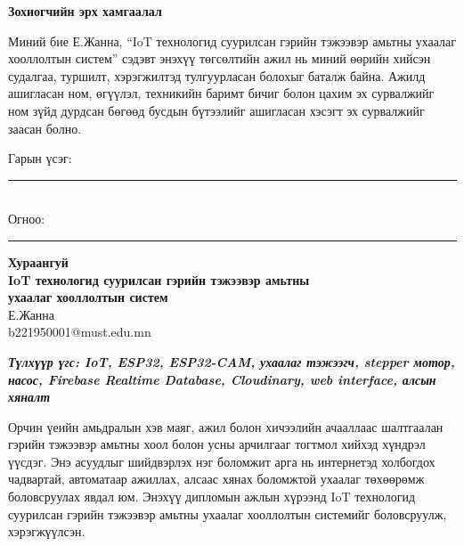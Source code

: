 \documentclass[12pt,a4paper]{report}
\begin{document}
\begin{center}
  \vspace*{2cm}
  {\huge\textbf{Зохиогчийн эрх хамгаалал}}
\end{center}
\vspace{1.2cm}

\noindent Миний бие Е.Жанна, ``IoT технологид суурилсан гэрийн тэжээвэр амьтны ухаалаг хооллолтын систем'' сэдэвт энэхүү төгсөлтийн ажил нь миний өөрийн хийсэн судалгаа, туршилт, хэрэгжилтэд тулгуурласан болохыг баталж байна. Ажилд ашигласан ном, өгүүлэл, техникийн баримт бичиг болон цахим эх сурвалжийг ном зүйд дурдсан бөгөөд бусдын бүтээлийг ашигласан хэсэгт эх сурвалжийг заасан болно.

\vspace{2cm}
\noindent Гарын үсэг: \rule{5cm}{0.4pt}\\[6pt]
\noindent Огноо: \rule{5cm}{0.4pt}

\newpage
\begin{center}
  \vspace*{1cm}
  {\huge\textbf{Хураангуй}}\\[0.8cm]
  {\large\textbf{IoT технологид суурилсан гэрийн тэжээвэр амьтны\\[4pt]
  ухаалаг хооллолтын систем}}\\[0.5cm]
  Е.Жанна\\
  b221950001@must.edu.mn
\end{center}
\vspace{0.6cm}

\noindent\textbf{\textit{Түлхүүр үгс: IoT, ESP32, ESP32-CAM, ухаалаг тэжээгч, stepper мотор, насос, Firebase Realtime Database, Cloudinary, web interface, алсын хяналт}}
\vspace{0.5cm}

\noindent Орчин үеийн амьдралын хэв маяг, ажил болон хичээлийн ачааллаас шалтгаалан гэрийн тэжээвэр амьтны хоол болон усны арчилгааг тогтмол хийхэд хүндрэл үүсдэг. Энэ асуудлыг шийдвэрлэх нэг боломжит арга нь интернетэд холбогдох чадвартай, автоматаар ажиллах, алсаас хянах боломжтой ухаалаг төхөөрөмж боловсруулах явдал юм. Энэхүү дипломын ажлын хүрээнд IoT технологид суурилсан гэрийн тэжээвэр амьтны ухаалаг хооллолтын системийг боловсруулж, хэрэгжүүлсэн.
\end{document}

